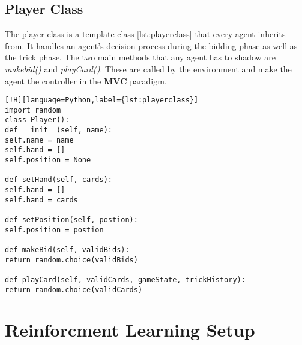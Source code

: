 \subsection{Player Class}
The player class is a template class \ref{lst:playerclass} that every agent inherits from.
It handles an agent's decision process during the bidding phase as well as the trick phase.
The two main methods that any agent has to shadow are \textit{makebid()} and \textit{playCard()}.
These are called by the environment and make the agent the controller in the \textbf{MVC} paradigm.
\newline
\begin{lstlisting}[!H][language=Python,label={lst:playerclass}]
import random
class Player():
def __init__(self, name):
self.name = name
self.hand = []
self.position = None

def setHand(self, cards):
self.hand = []
self.hand = cards

def setPosition(self, postion):
self.position = postion

def makeBid(self, validBids):
return random.choice(validBids)

def playCard(self, validCards, gameState, trickHistory):
return random.choice(validCards)
\end{lstlisting}
\section{Reinforcment Learning Setup}

